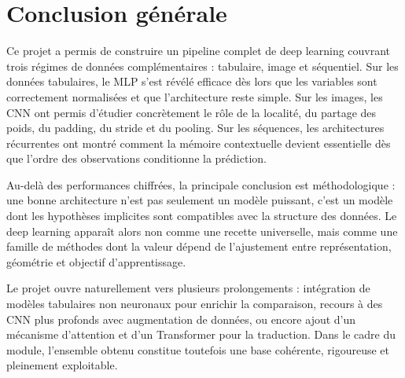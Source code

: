 \chapter{Conclusion générale}

Ce projet a permis de construire un pipeline complet de deep learning couvrant trois régimes de données complémentaires : tabulaire, image et séquentiel. Sur les données tabulaires, le MLP s’est révélé efficace dès lors que les variables sont correctement normalisées et que l’architecture reste simple. Sur les images, les CNN ont permis d’étudier concrètement le rôle de la localité, du partage des poids, du padding, du stride et du pooling. Sur les séquences, les architectures récurrentes ont montré comment la mémoire contextuelle devient essentielle dès que l’ordre des observations conditionne la prédiction.

Au-delà des performances chiffrées, la principale conclusion est méthodologique : une bonne architecture n’est pas seulement un modèle puissant, c’est un modèle dont les hypothèses implicites sont compatibles avec la structure des données. Le deep learning apparaît alors non comme une recette universelle, mais comme une famille de méthodes dont la valeur dépend de l’ajustement entre représentation, géométrie et objectif d’apprentissage.

Le projet ouvre naturellement vers plusieurs prolongements : intégration de modèles tabulaires non neuronaux pour enrichir la comparaison, recours à des CNN plus profonds avec augmentation de données, ou encore ajout d’un mécanisme d’attention et d’un Transformer pour la traduction. Dans le cadre du module, l’ensemble obtenu constitue toutefois une base cohérente, rigoureuse et pleinement exploitable.

